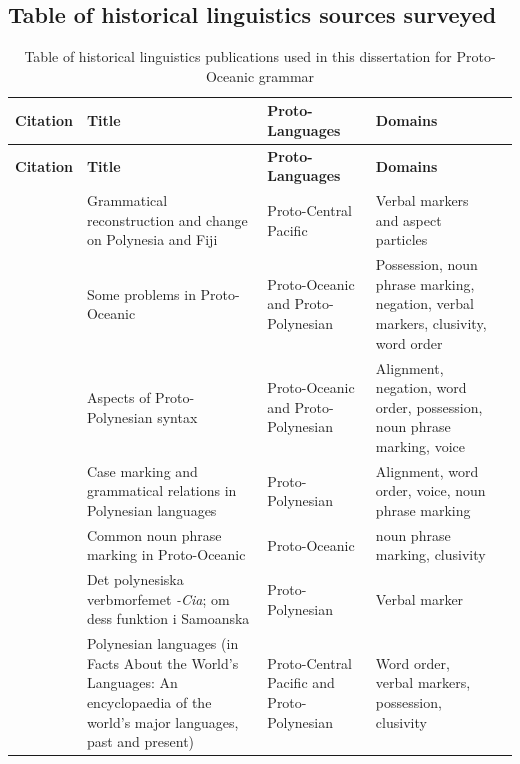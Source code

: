 \documentclass[12pt,letterpaper]{article}
\begin{document}
\FloatBarrier

\subsection{Table of historical linguistics sources surveyed}
\label{supp:proto_lg_coding_table}

\begin{longtable}{|p{3cm}|  p{5cm}| p{4cm} | p{3cm}  | p{3cm} |}
\caption{{Table of historical linguistics publications used in this dissertation for Proto-Oceanic grammar}}
\label{HL_prediction_table_summary} \\
\hline
\textbf{Citation}  & \textbf{Title} & \textbf{Proto-Languages}  & \textbf{Domains} \\ \hline
\endfirsthead

\hline
\textbf{Citation}  & \textbf{Title} & \textbf{Proto-Languages}  & \textbf{Domains} \\ \hline
\endhead


\citet{pawley1970change} & Grammatical reconstruction and change on Polynesia and Fiji & Proto-Central Pacific  &Verbal markers and aspect particles \\ \hline

\citet{pawley1973some} & Some problems in Proto-Oceanic & Proto-Oceanic and Proto-Polynesian  & Possession, noun phrase marking, negation, verbal markers, clusivity, word order  \\ \hline

\citet{clark1973aspects} & Aspects of Proto-Polynesian syntax & Proto-Oceanic and Proto-Polynesian  & Alignment, negation, word order, possession, noun phrase marking, voice \\ \hline

\citet{chung1978}  & Case marking and grammatical relations in Polynesian languages & Proto-Polynesian  & Alignment, word order, voice, noun phrase marking \\ \hline

\citet{crowley1985common}  & Common noun phrase marking in Proto-Oceanic & Proto-Oceanic &  noun phrase marking, clusivity  \\ \hline

\citet{jonsson1998} & Det polynesiska verbmorfemet \emph{-Cia}; om dess funktion i Samoanska & Proto-Polynesian & Verbal marker \\ \hline

\citet{marck2000_encyclo} & Polynesian languages (in Facts About the World's Languages: An encyclopaedia of the world's major languages, past and present)& Proto-Central Pacific and Proto-Polynesian & Word order, verbal markers, possession, clusivity \\ \hline


\end{longtable}
\end{document}
